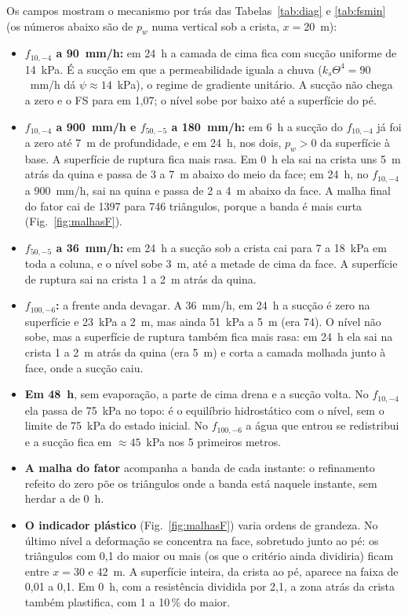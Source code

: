 \documentclass[11pt,a4paper]{article}
\begin{document}
Os campos mostram o mecanismo por trás das Tabelas~\ref{tab:diag} e \ref{tab:fsmin} (os números abaixo são de $p_w$ numa
vertical sob a crista, $x = 20$~m):
\begin{itemize}
  \item \textbf{$f_{10,-4}$ a 90~mm/h:} em 24~h a camada de cima fica com sucção uniforme de 14~kPa. É a sucção em que
    a permeabilidade iguala a chuva ($k_s\Theta^4 = 90$~mm/h dá $\psi \approx 14$~kPa), o regime de gradiente unitário.
    A sucção não chega a zero e o FS para em 1,07; o nível sobe por baixo até a superfície do pé.
  \item \textbf{$f_{10,-4}$ a 900~mm/h e $f_{50,-5}$ a 180~mm/h:} em 6~h a sucção do $f_{10,-4}$ já foi a zero até
    7~m de profundidade, e em 24~h, nos dois, $p_w > 0$ da superfície à base. A superfície de ruptura fica mais rasa.
    Em 0~h ela sai na crista uns 5~m atrás da quina e passa de 3 a 7~m abaixo do meio da face; em 24~h, no
    $f_{10,-4}$ a 900~mm/h, sai na quina e passa de 2 a 4~m abaixo da face. A malha final do fator cai de 1397 para
    746 triângulos, porque a banda é mais curta (Fig.~\ref{fig:malhasF}).
  \item \textbf{$f_{50,-5}$ a 36~mm/h:} em 24~h a sucção sob a crista cai para 7 a 18~kPa em toda a coluna, e o nível
    sobe 3~m, até a metade de cima da face. A superfície de ruptura sai na crista 1 a 2~m atrás da quina.
  \item \textbf{$f_{100,-6}$:} a frente anda devagar. A 36~mm/h, em 24~h a sucção é zero na superfície e 23~kPa a 2~m,
    mas ainda 51~kPa a 5~m (era 74). O nível não sobe, mas a superfície de ruptura também fica mais rasa: em 24~h ela
    sai na crista 1 a 2~m atrás da quina (era 5~m) e corta a camada molhada junto à face, onde a sucção caiu.
  \item \textbf{Em 48~h}, sem evaporação, a parte de cima drena e a sucção volta. No $f_{10,-4}$ ela passa de 75~kPa
    no topo: é o equilíbrio hidrostático com o nível, sem o limite de 75~kPa do estado inicial. No $f_{100,-6}$ a água
    que entrou se redistribui e a sucção fica em $\approx 45$~kPa nos 5 primeiros metros.
  \item \textbf{A malha do fator} acompanha a banda de cada instante: o refinamento refeito do zero põe os triângulos
    onde a banda está naquele instante, sem herdar a de 0~h.
  \item \textbf{O indicador plástico} (Fig.~\ref{fig:malhasF}) varia ordens de grandeza. No último nível a deformação
    se concentra na face, sobretudo junto ao pé: os triângulos com 0,1 do maior ou mais (os que o critério ainda
    dividiria) ficam entre $x = 30$ e 42~m. A superfície inteira, da crista ao pé, aparece na faixa de 0,01 a 0,1. Em
    0~h, com a resistência dividida por 2,1, a zona atrás da crista também plastifica, com 1 a 10\,\% do maior.
\end{itemize}
\end{document}
